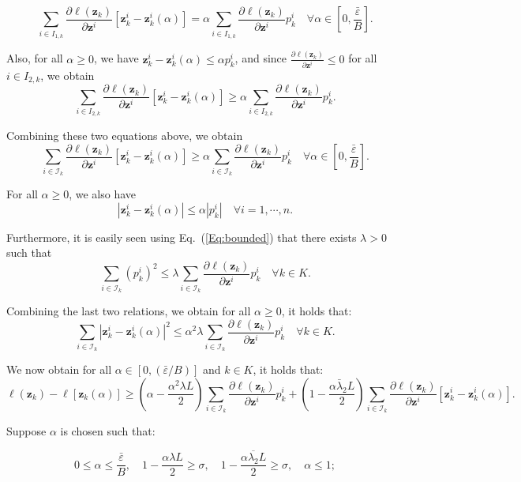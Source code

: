 \documentclass{article}
\theoremstyle{plain}
\theoremstyle{definition}
\def \sI {\mathcal{I}}
\def \z {\mathbf{z}}
\begin{document}
\[
  \sum_{i \in I_{1, k}} \frac{\partial \ell\left(\z_k\right)}{\partial \z^i} \left[\z_k^i - \z_k^i(\alpha)\right] = \alpha \sum_{i \in I_{1, k}} \frac{\partial \ell\left(\z_k\right)}{\partial \z^i} p_k^i \quad \forall \alpha \in \left[0, \frac{\bar{\varepsilon}}{B}\right].
\]

Also, for all \(\alpha \geq 0\), we have \(\z_k^i - \z_k^i(\alpha) \leq \alpha p_k^i\), and since \(\frac{\partial \ell\left(\z_k\right)}{\partial \z^i} \leq 0\) for all \(i \in I_{2, k}\), we obtain
\[
\sum_{i \in I_{2, k}} \frac{\partial \ell\left(\z_k\right)}{\partial \z^i} \left[\z_k^i - \z_k^i(\alpha)\right] \geq \alpha \sum_{i \in I_{2, k}} \frac{\partial \ell\left(\z_k\right)}{\partial \z^i} p_k^i.
\]

Combining these two equations above, we obtain
\[
\sum_{i \in \sI_k} \frac{\partial \ell\left(\z_k\right)}{\partial \z^i} \left[\z_k^i - \z_k^i(\alpha)\right] \geq \alpha \sum_{i \in \sI_k} \frac{\partial \ell\left(\z_k\right)}{\partial \z^i} p_k^i \quad \forall \alpha \in \left[0, \frac{\bar{\varepsilon}}{B}\right].
\]


For all \(\alpha \geq 0\), we also have
\[
\left|\z_k^i - \z_k^i(\alpha)\right| \leq \alpha \left|p_k^i\right| \quad \forall i=1, \cdots, n.
\]

Furthermore, it is easily seen using Eq.~(\ref{Eq:bounded}) that there exists \(\lambda > 0\) such that
\[
\sum_{i \in \sI_k}\left(p_k^i\right)^2 \leq \lambda \sum_{i \in \sI_k} \frac{\partial \ell\left(\z_k\right)}{\partial \z^i} p_k^i \quad \forall k \in K.
\]

Combining the last two relations, we obtain for all \(\alpha \geq 0\), it holds that: 
\[
\sum_{i \in \sI_k}\left|\z_k^i - \z_k^i(\alpha)\right|^2 \leq \alpha^2 \lambda \sum_{i \in \sI_k} \frac{\partial \ell\left(\z_k\right)}{\partial \z^i} p_k^i \quad \forall k \in K.
\]

We now obtain for all \(\alpha \in[0, (\bar{\varepsilon} / B)]\) and \(k \in K\), it holds that: 
\[
\ell\left(\z_k\right) - \ell\left[\z_k(\alpha)\right] \geq \left(\alpha - \frac{\alpha^2 \lambda L}{2}\right) \sum_{i \in \sI_k} \frac{\partial \ell\left(\z_k\right)}{\partial \z^i} p_k^i + \left(1 - \frac{\alpha \bar{\lambda}_2 L}{2}\right) \sum_{i \in \sI_k} \frac{\partial \ell\left(\z_k\right)}{\partial \z^i}\left[\z_k^i - \z_k^i(\alpha)\right].
\]

Suppose \(\alpha\) is chosen such that: 

\[
0 \leq \alpha \leq \frac{\bar{\varepsilon}}{B}, \quad 1 - \frac{\alpha \lambda L}{2} \geq \sigma, \quad 1 - \frac{\alpha \overline{\lambda_2} L}{2} \geq \sigma, \quad \alpha \leq 1;
\]
\end{document}
